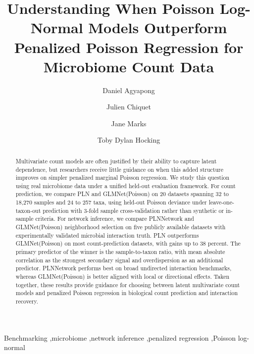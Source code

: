 \documentclass[preprint,review,12pt,authoryear]{elsarticle}
\begin{document}
\begin{frontmatter}

\title{Understanding When Poisson Log-Normal Models Outperform Penalized Poisson Regression for Microbiome Count Data}

\author[aff1]{Daniel Agyapong}
\author[aff2]{Julien Chiquet}
\author[aff3]{Jane Marks}
\author[aff4]{Toby Dylan Hocking}



\begin{abstract}
Multivariate count models are often justified by their ability to capture latent dependence, but researchers receive little guidance on when this added structure improves on simpler penalized marginal Poisson regression.
We study this question using real microbiome data under a unified held-out evaluation framework.
For count prediction, we compare PLN and GLMNet(Poisson) on 20 datasets spanning 32 to 18,270 samples and 24 to 257 taxa, using held-out Poisson deviance under leave-one-taxon-out prediction with 3-fold sample cross-validation rather than synthetic or in-sample criteria.
For network inference, we compare PLNNetwork and GLMNet(Poisson) neighborhood selection on five publicly available datasets with experimentally validated microbial interaction truth.
PLN outperforms GLMNet(Poisson) on most count-prediction datasets, with gains up to 38 percent.
The primary predictor of the winner is the sample-to-taxon ratio, with mean absolute correlation as the strongest secondary signal and overdispersion as an additional predictor.
PLNNetwork performs best on broad undirected interaction benchmarks, whereas GLMNet(Poisson) is better aligned with local or directional effects.
Taken together, these results provide guidance for choosing between latent multivariate count models and penalized Poisson regression in biological count prediction and interaction recovery.
\end{abstract}

\begin{keyword}
Benchmarking \sep microbiome \sep network inference \sep penalized regression \sep Poisson log-normal
\end{keyword}

\end{frontmatter}
\end{document}

